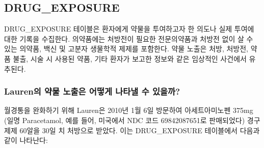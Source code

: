 \documentclass[10.5pt]{book}
\theoremstyle{definition}
\theoremstyle{definition}
\theoremstyle{definition}
\theoremstyle{remark}
\begin{document}
\subsection{DRUG\_EXPOSURE}\label{drugExposure}

DRUG\_EXPOSURE 테이블은 환자에게 약물을 투여하고자 한 의도나 실제 투여에
대한 기록을 수집한다. 의약품에는 처방전이 필요한 전문의약품과 처방전
없이 살 수 있는 의약품, 백신 및 고분자 생물학적 제제를 포함한다. 약물
노출은 처방, 처방전, 약품 불출, 시술 시 사용된 약품, 기타 환자가 보고한
정보와 같은 임상적인 사건에서 유추된다.

\subsubsection*{Lauren의 약물 노출은 어떻게 나타낼 수
있을까?}\label{lauren------}

월경통을 완화하기 위해 Lauren은 2010년 1월 6일 방문하여 아세트아미노펜
375mg (일명 Paracetamol, 예를 들어, 미국에서 NDC 코드 69842087651로
판매되었다) 경구 제제 60알을 30일 치 처방으로 받았다. 이는
DRUG\_EXPOSURE 테이블에서 다음과 같이 나타난다:
\end{document}
